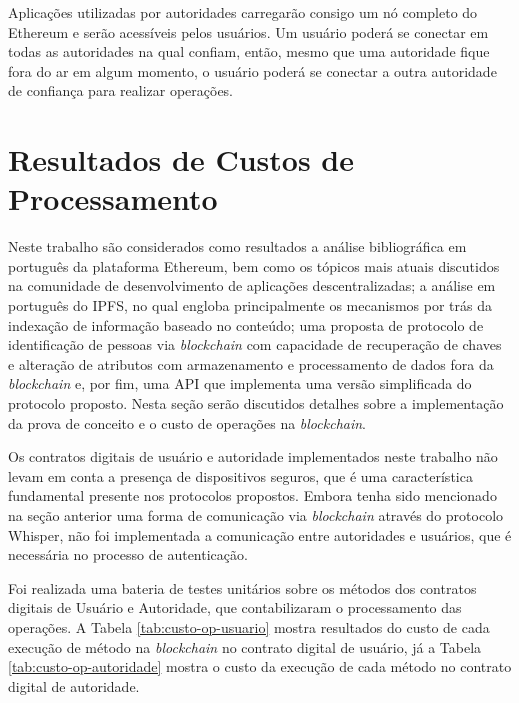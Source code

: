 \documentclass[tcc,capa]{texufpel}
\begin{document}
    Aplicações utilizadas por autoridades carregarão consigo um nó completo do Ethereum e serão acessíveis pelos usuários. Um usuário poderá se conectar em todas as autoridades na qual confiam, então, mesmo que uma autoridade fique fora do ar em algum momento, o usuário poderá se conectar a outra autoridade de confiança para realizar operações.


\chapter{Resultados de Custos de Processamento}\label{chap:resultados}

    Neste trabalho são considerados como resultados a análise bibliográfica em português da plataforma Ethereum, bem como os tópicos mais atuais discutidos na comunidade de desenvolvimento de aplicações descentralizadas; a análise em português do IPFS, no qual engloba principalmente os mecanismos por trás da indexação de informação baseado no conteúdo; uma proposta de protocolo de identificação de pessoas via \textit{blockchain} com capacidade de recuperação de chaves e alteração de atributos com armazenamento e processamento de dados fora da \textit{blockchain} e, por fim, uma API que implementa uma versão simplificada do protocolo proposto. Nesta seção serão discutidos detalhes sobre a implementação da prova de conceito e o custo de operações na \textit{blockchain}.
    
    Os contratos digitais de usuário e autoridade implementados neste trabalho não levam em conta a presença de dispositivos seguros, que é uma característica fundamental presente nos protocolos propostos. Embora tenha sido mencionado na seção anterior uma forma de comunicação via \textit{blockchain} através do protocolo Whisper, não foi implementada a comunicação entre autoridades e usuários, que é necessária no processo de autenticação.
    
    Foi realizada uma bateria de testes unitários sobre os métodos dos contratos digitais de Usuário e Autoridade, que contabilizaram o processamento das operações. A Tabela \ref{tab:custo-op-usuario} mostra resultados do custo de cada execução de método na \textit{blockchain} no contrato digital de usuário, já a Tabela \ref{tab:custo-op-autoridade} mostra o custo da execução de cada método no contrato digital de autoridade.
    
\end{document}
